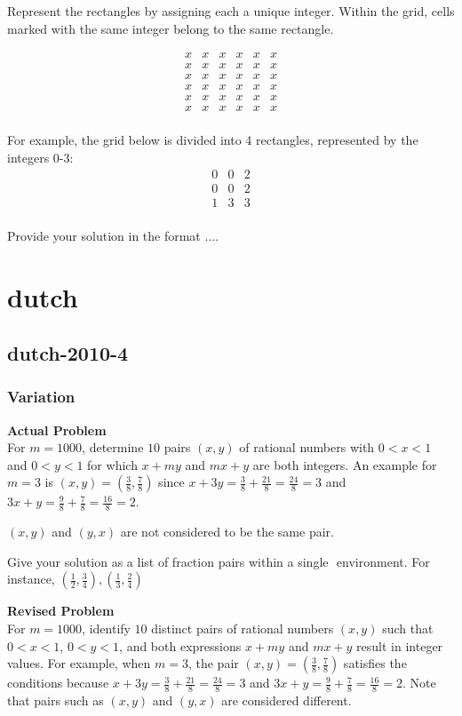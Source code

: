 Represent the rectangles by assigning each a unique integer. Within the grid, cells marked with the same integer belong to the same rectangle.

$$\begin{array}{cccccc}
x & x & x & x & x & x \\
x & x & x & x & x & x \\
x & x & x & x & x & x \\
x & x & x & x & x & x \\
x & x & x & x & x & x \\
x & x & x & x & x & x \\
\end{array}$$

For example, the grid below is divided into 4 rectangles, represented by the integers 0-3:
$$
\begin{array}{ccc}
0 & 0 & 2 \\
0 & 0 & 2 \\
1 & 3 & 3 \\
\end{array}
$$

Provide your solution in the format $\boxed{...}$.

\section{dutch}
\subsection{dutch-2010-4}
\subsubsection{Variation}
\textbf{Actual Problem}\\
For $m = 1000$, determine $10$ pairs $(x,y)$ of rational numbers with $0 < x < 1$ and $0 < y < 1$ for which $x+my$ and $mx+y$ are both integers. An example for $m = 3$ is $(x, y) = \left(\frac{3}{8},\frac{7}{8}\right)$ since $x+3y=\frac{3}{8} + \frac{21}{8} = \frac{24}{8} = 3$ and $3x+y=\frac{9}{8} + \frac{7}{8} = \frac{16}{8} = 2$.

$(x,y)$ and $(y,x)$ are not considered to be the same pair.

Give your solution as a list of fraction pairs within a single $\boxed{}$ environment. For instance, $\boxed{(\frac{1}{2},\frac{3}{4}),(\frac{1}{3},\frac{2}{4})}$

\textbf{Revised Problem}\\
For $m = 1000$, identify $10$ distinct pairs of rational numbers $(x, y)$ such that $0 < x < 1$, $0 < y < 1$, and both expressions $x + my$ and $mx + y$ result in integer values. For example, when $m = 3$, the pair $(x, y) = \left(\frac{3}{8}, \frac{7}{8}\right)$ satisfies the conditions because $x + 3y = \frac{3}{8} + \frac{21}{8} = \frac{24}{8} = 3$ and $3x + y = \frac{9}{8} + \frac{7}{8} = \frac{16}{8} = 2$. Note that pairs such as $(x, y)$ and $(y, x)$ are considered different.

